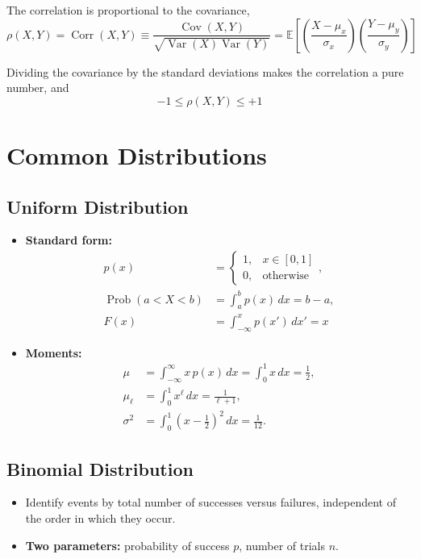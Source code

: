 \documentclass{article}
\begin{document}
\noindent The correlation is proportional to the covariance,
\[
\rho(X,Y) = \operatorname{Corr}(X,Y) \equiv \frac{\operatorname{Cov}(X,Y)}{\sqrt{\operatorname{Var}(X)\operatorname{Var}(Y)}} = \mathbb{E}\left[\left(\frac{X-\mu_x}{\sigma_x}\right)\left(\frac{Y-\mu_y}{\sigma_y}\right)\right]
\]

\noindent Dividing the covariance by the standard deviations makes the correlation a pure number, and
\[
-1 \leq \rho(X,Y) \leq +1
\]

\section*{Common Distributions}

\subsection*{Uniform Distribution}

\begin{itemize}
    \item \textbf{Standard form:}
    \begin{align*}
        p(x) &= \begin{cases}
            1, & x \in [0,1] \\
            0, & \text{otherwise}
        \end{cases}, \\[0.8em]
        \operatorname{Prob}(a < X < b) &= \int_a^b p(x)\,dx = b-a, \\[0.8em]
        F(x) &= \int_{-\infty}^x p(x')\,dx' = x
    \end{align*}

    \item \textbf{Moments:}
    \begin{align*}
        \mu &= \int_{-\infty}^{\infty} x\,p(x)\,dx = \int_0^1 x\,dx = \frac{1}{2}, \\[0.8em]
        \mu_\ell &= \int_0^1 x^\ell\,dx = \frac{1}{\ell + 1}, \\[0.8em]
        \sigma^2 &= \int_0^1 \left(x - \frac{1}{2}\right)^2\,dx = \frac{1}{12}.
    \end{align*}
\end{itemize}

\subsection*{Binomial Distribution}

\begin{itemize}
    \item Identify events by total number of successes versus failures, independent of the order in which they occur.

    \item \textbf{Two parameters:} probability of success $p$, number of trials $n$.
\end{itemize}
\end{document}

